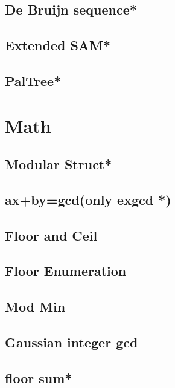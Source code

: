 \subsection{De Bruijn sequence*} %

\subsection{Extended SAM*} %

\subsection{PalTree*} %



\section{Math}
\subsection{Modular Struct*}

\subsection{ax+by=gcd(only exgcd *)} %

\subsection{Floor and Ceil}

\subsection{Floor Enumeration}

\subsection{Mod Min}

\subsection{Gaussian integer gcd}

 \subsection{floor sum*} %
 
